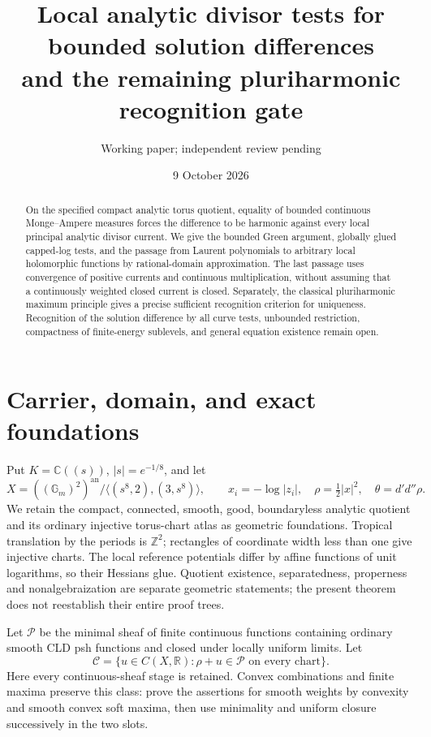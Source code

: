 \documentclass[11pt]{article}
\title{Local analytic divisor tests for bounded solution differences\\and the remaining pluriharmonic recognition gate}
\author{Working paper; independent review pending}
\date{9 October 2026}
\newcommand{\DD}{d'd''}
\begin{document}
\maketitle
\begin{abstract}
On the specified compact analytic torus quotient, equality of bounded
continuous Monge--Ampere measures forces the difference to be harmonic
against every local principal analytic divisor current. We give the
bounded Green argument, globally glued capped-log tests, and the passage
from Laurent polynomials to arbitrary local holomorphic functions by
rational-domain approximation. The last passage uses convergence of
positive currents and continuous multiplication, without assuming that
a continuously weighted closed current is closed. Separately, the
classical pluriharmonic maximum principle gives a precise sufficient
recognition criterion for uniqueness. Recognition of the solution
difference by all curve tests, unbounded restriction, compactness of
finite-energy sublevels, and general equation existence remain open.
\end{abstract}

\section{Carrier, domain, and exact foundations}
Put $K=\mathbb C((s))$, $|s|=e^{-1/8}$, and let
\[
 X=((\mathbb G_m)^2)^{\mathrm{an}}/
 \langle(s^8,2),(3,s^8)\rangle,
 \qquad x_i=-\log|z_i|,
 \quad \rho=\tfrac12|x|^2,
 \quad\theta=\DD\rho.
\]
We retain the compact, connected, smooth, good, boundaryless analytic
quotient and its ordinary injective torus-chart atlas as geometric
foundations. Tropical translation by the periods is $\mathbb Z^2$;
rectangles of coordinate width less than one give injective charts.
The local reference potentials differ by affine functions of unit
logarithms, so their Hessians glue. Quotient existence, separatedness,
properness and nonalgebraization are separate geometric statements;
the present theorem does not reestablish their entire proof trees.

Let $\mathscr P$ be the minimal sheaf of finite continuous functions
containing ordinary smooth CLD psh functions and closed under locally
uniform limits. Let
\[
 \mathcal C=\{u\in C(X,\mathbb R):\rho+u\in\mathscr P
                         \text{ on every chart}\}.
\]
Here every continuous-sheaf stage is retained. Convex combinations and
finite maxima preserve this class: prove the assertions for smooth
weights by convexity and smooth convex soft maxima, then use minimality
and uniform closure successively in the two slots.
\end{document}
